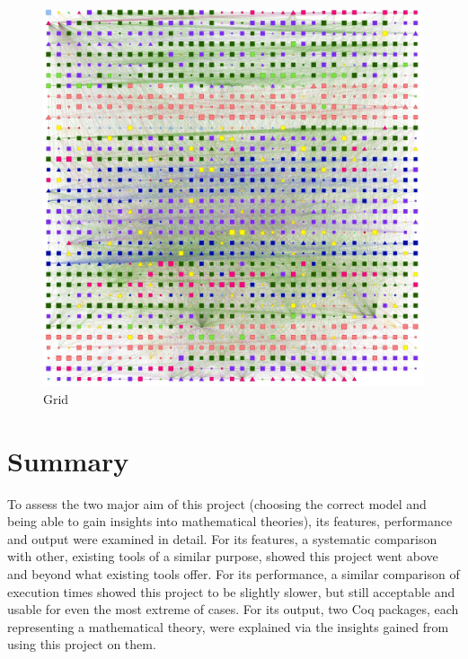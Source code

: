 \begin{figure}[p]
\centering
\includegraphics[height=0.45\textheight]{img/oot/grid}
\caption{Grid}\label{fig:oot:grid}
\end{figure}

\newpage%
\section{Summary}

To assess the two major aim of this project (choosing the correct model and
being able to gain insights into mathematical theories), its features,
performance and output were examined in detail. For its features, a systematic
comparison with other, existing tools of a similar purpose, showed this project
went above and beyond what existing tools offer. For its performance, a similar
comparison of execution times showed this project to be slightly slower, but
still acceptable and usable for even the most extreme of cases. For its output,
two Coq packages, each representing a mathematical theory, were explained via
the insights gained from using this project on them.
